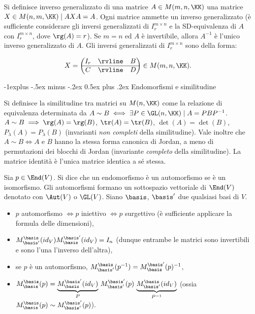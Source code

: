 \documentclass[10pt,landscape]{article}
\makeatletter
\renewcommand{\subsection}{\@startsection{subsection}{2}{0mm}%
	{-1explus -.5ex minus -.2ex}%
	{0.5ex plus .2ex}%
	{\normalfont\normalsize\bfseries}}
\makeatother
\begin{document}
\begin{multicols}{3}
		Si definisce inverso generalizzato di una matrice $A \in M(m, n, \KK)$
		una matrice $X \in M(n, m, \KK) \mid AXA=A$. Ogni matrice ammette
		un inverso generalizzato (è sufficiente considerare gli inversi
		generalizzati di $I^{m \times n}_r$ e la SD-equivalenza di $A$
		con $I^{m \times n}_r$, dove $\rg(A)=r$). Se $m=n$ ed $A$ è invertibile, allora
		$A^{-1}$ è l'unico inverso generalizzato di $A$. Gli inversi
		generalizzati di $I^{m \times n}_r$ sono della forma:
		
		\[X =
		\begin{pmatrix}
			I_r
			& \rvline & B \\
			\hline
			C & \rvline &
			D
		\end{pmatrix} \in M(m, n, \KK). \]
		
		\subsection{Endomorfismi e similitudine}
		
		Si definisce la similitudine tra matrici su $M(n, \KK)$ come la relazione
		di equivalenza determinata da $A \sim B \iff \exists P \in \GL(n, \KK)
		\mid A = PBP^{-1}$. $A \sim B \implies \rg(A)=\rg(B)$, $\tr(A)=\tr(B)$,
		$\det(A)=\det(B)$, $P_\lambda(A) = P_\lambda(B)$ (invarianti \textit{non completi} della similitudine).
		Vale inoltre che $A \sim B \iff A$ e $B$ hanno la stessa forma
		canonica di Jordan, a meno di permutazioni dei blocchi di Jordan
		(invariante \textit{completo} della similitudine). La matrice
		identità è l'unica matrice identica a sé stessa.
		
		Sia $p \in \End(V)$. Si dice che un endomorfismo è un automorfismo
		se è un isomorfismo. Gli automorfismi formano un sottospazio vettoriale
		di $\End(V)$ denotato con $\Aut(V)$ o $\GL(V)$. Siano $\basis$, $\basis'$ due qualsiasi
		basi di $V$.
		
		\begin{itemize}
			\item $p$ automorfismo $\iff p$ iniettivo $\iff p$ surgettivo (è
			sufficiente applicare la formula delle dimensioni),
			\item $M^\basis_{\basis'}(id_V) M^{\basis'}_\basis(id_V)
			= I_n$ (dunque entrambe le matrici sono invertibili e sono
			l'una l'inverso dell'altra),
			\item se $p$ è un automorfismo, $M^\basis_{\basis'}(p^{-1}) =
			M^{\basis'}_\basis(p)^{-1}$,
			\item $M^\basis_{\basis}(p) = \underbrace{M^{\basis'}_\basis (id_V)}_{P} \,
			M^{\basis'}_{\basis'}(p) \,
			\underbrace{M^{\basis}_{\basis'} (id_V)}_{P^{-1}}$ (ossia
			$M^\basis_{\basis}(p) \sim M^{\basis'}_{\basis'}(p)$).
		\end{itemize}
		

\end{multicols}
\end{document}
